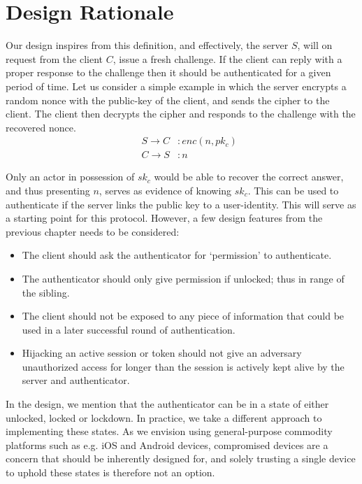 \section{Design Rationale}
Our design inspires from this definition, and effectively, the \gls{server} $S$, will on request from the \gls{client} $C$, issue a fresh challenge. If the client can reply with a proper response to the challenge then it should be authenticated for a given period of time. Let us consider a simple example in which the \gls{server} encrypts a random nonce with the public-key of the \gls{client}, and sends the cipher to the client. The client then decrypts the cipher and responds to the challenge with the recovered nonce.
{\setlength{\mathindent}{0cm}
\begin{align}
    \tag{message 1} && S \rightarrow C &: enc(n,pk_c)\\
    \tag{message 2} && C \rightarrow S &: n
\end{align}}

Only an actor in possession of $sk_c$ would be able to recover the correct answer, and thus presenting $n$, serves as evidence of knowing $sk_c$. This can be used to authenticate if the server links the public key to a user-identity. This will serve as a starting point for this protocol. However, a few design features from the previous chapter needs to be considered:
\begin{itemize}
    \item The \gls{client} should ask the \gls{authenticator} for `permission' to authenticate.
    \item The \gls{authenticator} should only give permission if unlocked; thus in range of the \gls{sibling}.
    \item The \gls{client} should not be exposed to any piece of information that could be used in a later successful round of authentication. 
    \item  Hijacking an active session or token should not give an \gls{adversary} unauthorized access for longer than the session is actively kept alive by the \gls{server} and \gls{authenticator}.
\end{itemize}

In the design, we mention that the \gls{authenticator} can be in a state of either unlocked, locked or lockdown. In practice, we take a different approach to implementing these states. As we envision using general-purpose commodity platforms such as e.g. iOS and Android devices, compromised devices are a concern that should be inherently designed for, and solely trusting a single device to uphold these states is therefore not an option.

